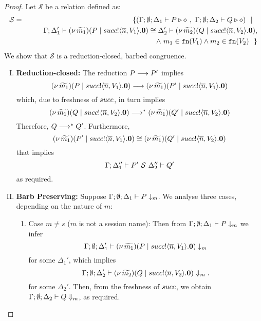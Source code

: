 \begin{proof}
	\noi Let $\mathcal{S}$ be a relation defined as:
%
	\begin{eqnarray*}
		\mathcal{S}	&=&
					\{(\Gamma; \emptyset; \Delta_1 \vdash P \triangleright \diamond\ ,\ \Gamma; \emptyset; \Delta_2 \vdash Q \triangleright \diamond) \ \ |\ \  \\
				& &	\qquad \Gamma; \Delta_1' \vdash (\nu\, \widetilde{m_1})(P \;|\; succ ! \langle \overline{n}, V_1 \rangle . \mathbf{0}) \cong \Delta'_2 \vdash (\nu\, \widetilde{m_2})(Q \;|\; succ ! \langle \overline{n}, V_2 \rangle . \mathbf{0}),\\
				&&   \qquad \land~ m_1 \in \mathtt{fn}(V_1) \land m_2 \in\mathtt{fn}(V_2) ~~\}
	\end{eqnarray*}
%
	\noi We show that $\mathcal{S}$ is a reduction-closed, barbed congruence.


	\begin{enumerate}[I.]
		\item	{\bf Reduction-closed:} The reduction  $P \longrightarrow P'$
				implies
				\[
					(\nu\, \widetilde{m_1})(P \;|\; succ ! \langle \overline{n}, V_1 \rangle . \mathbf{0})
					\longrightarrow
					(\nu\, \widetilde{m_1})(P' \;|\; succ ! \langle \overline{n}, V_1 \rangle . \mathbf{0})
				\]
				which, due to freshness of $succ$, in turn implies
				\[
					(\nu\, \widetilde{m_1})(Q \;|\; succ ! \langle \overline{n}, V_2 \rangle . \mathbf{0})
					\longrightarrow^{*}
					(\nu\, \widetilde{m_1})(Q' \;|\; succ ! \langle \overline{n}, V_2 \rangle . \mathbf{0})
				\]
				Therefore, $Q \longrightarrow^{*} Q'$. Furthermore,
				\[
					(\nu\, \widetilde{m_1})(P' \;|\; succ ! \langle \overline{n}, V_1 \rangle . \mathbf{0}) \cong 
					(\nu\, \widetilde{m_1})(Q' \;|\; succ ! \langle \overline{n}, V_2 \rangle . \mathbf{0})
				\]
				that implies
				\[
					\Gamma; \Delta_1'' \proves P'\ \mathcal{S}\ \Delta_2'' \proves  Q'
				\]
				as required.

	\item	{\bf Barb Preserving:} Suppose $\Gamma; \emptyset; \Delta_1 \vdash P \downarrow_{m}$. We analyse three cases, depending on the nature of $m$:
		    \begin{enumerate}[1.]
				\item	Case $m \not= s$ ($m$ is not a session name): Then from
						$\Gamma; \emptyset; \Delta_1 \vdash P \downarrow_{m}$
						we infer 
						\[
							\Gamma; \emptyset; \Delta_1' \vdash
							(\nu\, \widetilde{m_1})(P \;|\; succ ! \langle \overline{n}, V_1 \rangle . \mathbf{0})
							\downarrow_{m} 
						\]
						for some $\Delta_1'$, which implies
						\[
							\Gamma; \emptyset; \Delta_2' \vdash
							(\nu\, \widetilde{m_2})(Q \;|\; succ ! \langle \overline{n}, V_2 \rangle . \mathbf{0})
							\Downarrow_{m}.
						\]
						for some $\Delta_2'$.
						Then, from the freshness of $succ$, we obtain 
						$\Gamma; \emptyset; \Delta_2 \vdash Q \Downarrow_{m}$, as required.


\end{enumerate}
\end{enumerate}
\end{proof}
